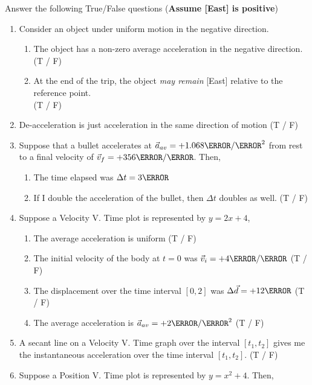 \documentclass[12pt]{article} %
\begin{document}
\begin{qstn}[1] %
    Answer the following True/False questions (\textbf{Assume [East] is positive})
    \begin{enumerate}
        \item Consider an object under uniform motion in the negative direction.
            \begin{enumerate}[label = (\alph*)]
                \item The object has a non-zero average acceleration in the negative direction. (T / F) 
                \item At the end of the trip, the object \emph{may remain} [East] relative to the reference point. \\(T / F)
            \end{enumerate}
        \item De-acceleration is just acceleration in the same direction of motion (T / F)
        \item Suppose that a bullet accelerates at $\vec a_{av} = +1.068 \km / \s^2$ from rest to a final velocity of $\vec v_f = +356 \m / \s$. Then,
            \begin{enumerate}[label = (\alph*)]
                \item The time elapsed was $\Delta t = 3\s$
                \item If I double the acceleration of the bullet, then $\Delta t$ doubles as well. (T / F)
            \end{enumerate}
        \item Suppose a Velocity V. Time plot is represented by $y = 2x + 4$,
            \begin{enumerate}[label = (\alph*)]
                \item The average acceleration is uniform (T / F)
                \item The initial velocity of the body at $t = 0$ was $\vec v_i = +4 \m / \s$ (T / F)
                \item The displacement over the time interval $[0,2]$ was $\Delta \vec d = +12\m$ (T / F)
                \item The average acceleration is $\vec a_{av} = +2\m / \s^2$ (T / F)
            \end{enumerate}
        \item A secant line on a Velocity V. Time graph over the interval $[t_1,t_2]$ gives me the instantaneous acceleration over the time interval $[t_1,t_2]$. (T / F)
        \item Suppose a Position V. Time plot is represented by $y = x^2 + 4$. Then,

\end{enumerate}
\end{qstn}
\end{document}
